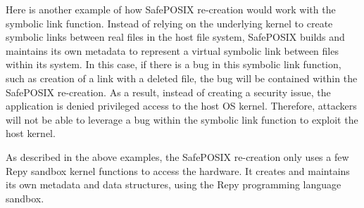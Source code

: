  Here is another example of how SafePOSIX re-creation would work with the symbolic link function.
Instead of relying on the underlying kernel to create symbolic links between real files
in the host file system, SafePOSIX builds and maintains its own metadata to represent a virtual symbolic link
between files within its system. In this case, if there is a bug in this symbolic link function,
such as creation of a link with a deleted file, the bug will be contained within the SafePOSIX re-creation.
As a result, instead of creating a security issue, the application is denied privileged access to the host OS kernel.
Therefore, attackers will not be able to leverage a bug within the symbolic link function to exploit the host kernel.

As described in the above examples, the SafePOSIX re-creation only uses a few Repy sandbox kernel functions to access the hardware.
It creates and maintains its own metadata and data structures, using the Repy programming language sandbox.
